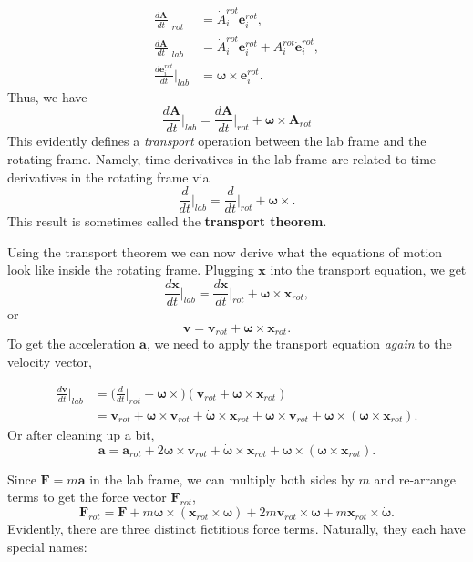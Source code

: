 \documentclass[
  letterpaper,
  DIV=11,
  numbers=noendperiod]{scrreprt}
\begin{document}
\[
\begin{align*}
\frac{d\mathbf{A}}{dt}\bigg|_{rot} &= \dot A_i^{rot} \mathbf{e}_i^{rot}, \\
\frac{d\mathbf{A}}{dt}\bigg|_{lab} &= \dot A_i^{rot} \mathbf{e}_i^{rot} + A_i^{rot} \mathbf{\dot e}_i^{rot}, \\
\frac{d\mathbf{e}_i^{rot}}{dt}\bigg|_{lab} &= \boldsymbol{\omega} \times \mathbf{e}_i^{rot}.
\end{align*}
\] Thus, we have \[
\frac{d\mathbf{A}}{dt}\bigg|_{lab} = \frac{d\mathbf{A}}{dt}\bigg|_{rot} + \boldsymbol{\omega} \times \mathbf{A}_{rot}
\] This evidently defines a \emph{transport} operation between the lab
frame and the rotating frame. Namely, time derivatives in the lab frame
are related to time derivatives in the rotating frame via \[
\frac{d}{dt}\bigg|_{lab} = \frac{d}{dt}\bigg|_{rot} + \boldsymbol{\omega} \times.
\] This result is sometimes called the \textbf{transport theorem}.

Using the transport theorem we can now derive what the equations of
motion look like inside the rotating frame. Plugging \(\mathbf{x}\) into
the transport equation, we get \[
\frac{d\mathbf{x}}{dt}\bigg|_{lab} = \frac{d\mathbf{x}}{dt}\bigg|_{rot} + \boldsymbol{\omega} \times \mathbf{x}_{rot},
\] or \[
\mathbf{v} = \mathbf{v}_{rot} + \boldsymbol{\omega} \times \mathbf{x}_{rot}.
\] To get the acceleration \(\mathbf{a}\), we need to apply the
transport equation \emph{again} to the velocity vector,

\[
\begin{align*}
\frac{d\mathbf{v}}{dt}\bigg|_{lab} &= \bigg(\frac{d}{dt}\bigg|_{rot} + \boldsymbol{\omega} \times \bigg) (\mathbf{v}_{rot} + \boldsymbol{\omega} \times \mathbf{x}_{rot}) \\
&= \mathbf{\dot v}_{rot} + \boldsymbol{\omega} \times \mathbf{v}_{rot} + \boldsymbol{\dot \omega} \times \mathbf{x}_{rot} + \boldsymbol{\omega} \times \mathbf{v}_{rot} + \boldsymbol{\omega} \times (\boldsymbol{\omega} \times \mathbf{x}_{rot}).
\end{align*}
\] Or after cleaning up a bit, \[
\mathbf{a} = \mathbf{a}_{rot} + 2 \boldsymbol{\omega} \times \mathbf{v}_{rot} + \boldsymbol{\dot \omega} \times \mathbf{x}_{rot} + \boldsymbol{\omega} \times (\boldsymbol{\omega} \times \mathbf{x}_{rot}).
\]

Since \(\mathbf{F} = m \mathbf{a}\) in the lab frame, we can multiply
both sides by \(m\) and re-arrange terms to get the force vector
\(\mathbf{F}_{rot}\), \[
\mathbf{F}_{rot} = \mathbf{F} + m \boldsymbol{\omega} \times (\mathbf{x}_{rot} \times \boldsymbol{\omega}) + 2m \mathbf{v}_{rot} \times \boldsymbol{\omega} + m \mathbf{x}_{rot} \times \boldsymbol{\dot \omega}.
\] Evidently, there are three distinct fictitious force terms.
Naturally, they each have special names:
\end{document}
